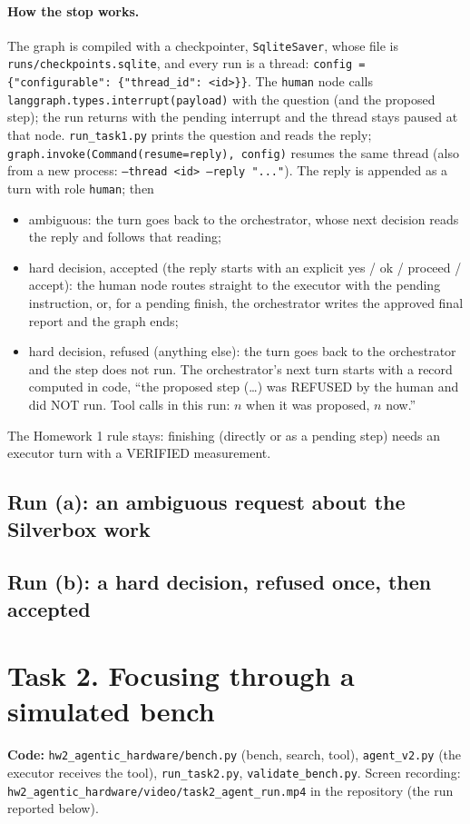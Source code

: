 \documentclass[11pt,a4paper]{article}
\newcommand{\videonote}{\texttt{hw2\_agentic\_hardware/video/task2\_agent\_run.mp4} in the repository (the run reported below)}
\begin{document}
\paragraph{How the stop works.} The graph is compiled with a checkpointer, \texttt{SqliteSaver}, whose file is
\texttt{runs/checkpoints.sqlite}, and every run is a thread: \texttt{config = \{"configurable": \{"thread\_id": <id>\}\}}.
The \texttt{human} node calls \texttt{langgraph.types.interrupt(payload)} with the question (and the proposed step); the run
returns with the pending interrupt and the thread stays paused at that node. \texttt{run\_task1.py} prints the question and
reads the reply; \texttt{graph.invoke(Command(resume=reply), config)} resumes the same thread (also from a new process:
\texttt{--thread <id> --reply "..."}). The reply is appended as a turn with role \texttt{human}; then
\begin{itemize}[leftmargin=*,itemsep=1pt]
\item ambiguous: the turn goes back to the orchestrator, whose next decision reads the reply and follows that reading;
\item hard decision, accepted (the reply starts with an explicit yes / ok / proceed / accept): the human node routes straight to
the executor with the pending instruction, or, for a pending finish, the orchestrator writes the approved final report and the
graph ends;
\item hard decision, refused (anything else): the turn goes back to the orchestrator and the step does not run. The orchestrator's
next turn starts with a record computed in code, ``the proposed step (\dots) was REFUSED by the human and did NOT run. Tool calls
in this run: $n$ when it was proposed, $n$ now.''
\end{itemize}
The Homework 1 rule stays: finishing (directly or as a pending step) needs an executor turn with a VERIFIED measurement.

\subsection*{Run (a): an ambiguous request about the Silverbox work}

\subsection*{Run (b): a hard decision, refused once, then accepted}


\section*{Task 2. Focusing through a simulated bench}
\textbf{Code:} \texttt{hw2\_agentic\_hardware/bench.py} (bench, search, tool), \texttt{agent\_v2.py} (the executor receives the
tool), \texttt{run\_task2.py}, \texttt{validate\_bench.py}. Screen recording: \videonote.
\end{document}
